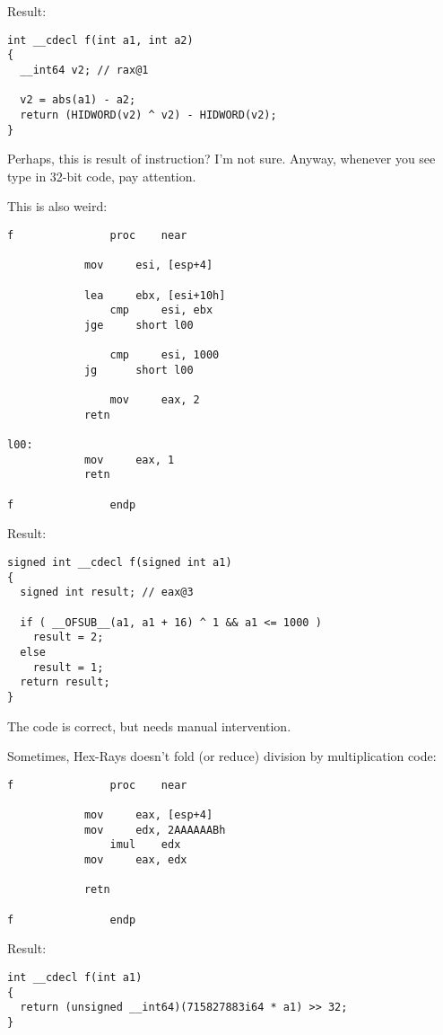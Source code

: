 Result:

\begin{lstlisting}
int __cdecl f(int a1, int a2)
{
  __int64 v2; // rax@1

  v2 = abs(a1) - a2;
  return (HIDWORD(v2) ^ v2) - HIDWORD(v2);
}
\end{lstlisting}

Perhaps, this is result of  instruction? I'm not sure.
Anyway, whenever you see  type in 32-bit code, pay attention.

This is also weird:

\begin{lstlisting}
f               proc    near

	        mov     esi, [esp+4]

        	lea     ebx, [esi+10h]
                cmp     esi, ebx
	        jge     short l00

                cmp     esi, 1000
	        jg      short l00

                mov     eax, 2
	        retn

l00:
	        mov     eax, 1
        	retn

f               endp
\end{lstlisting}

Result:

\begin{lstlisting}
signed int __cdecl f(signed int a1)
{
  signed int result; // eax@3

  if ( __OFSUB__(a1, a1 + 16) ^ 1 && a1 <= 1000 )
    result = 2;
  else
    result = 1;
  return result;
}
\end{lstlisting}

The code is correct, but needs manual intervention.

Sometimes, Hex-Rays doesn't fold (or reduce) division by multiplication code:

\begin{lstlisting}
f               proc    near

        	mov     eax, [esp+4]
	        mov     edx, 2AAAAAABh
                imul    edx
        	mov     eax, edx

	        retn

f               endp
\end{lstlisting}

Result:

\begin{lstlisting}
int __cdecl f(int a1)
{
  return (unsigned __int64)(715827883i64 * a1) >> 32;
}
\end{lstlisting}

